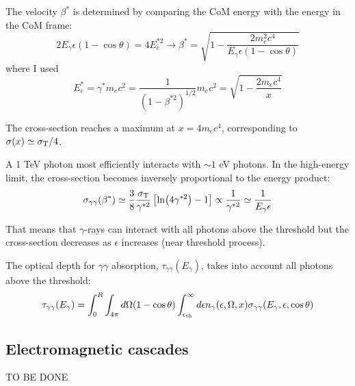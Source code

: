 The velocity \(\beta^*\) is determined by comparing the CoM energy with the energy in the CoM frame:
%
\[
2E_\gamma \epsilon(1- \cos\theta) = 4 E_e^{*2} \rightarrow \beta^* = \sqrt{1 - \frac{2 m_e^2 c^4}{E_\gamma \epsilon (1-\cos\theta)}}
\]
%
where I used
%
\[
E_e^* = \gamma^* m_e c^2 = \frac{1}{(1-\beta^{*2})^{1/2}} m_e c^2 = \sqrt{1 - \frac{2 m_e c^4}{x}}
\]

The cross-section reaches a maximum at \(x = 4 m_e c^4\), corresponding to \(\sigma(x) \simeq \sigma_{\rm T}/4\).

A 1 TeV photon most efficiently interacts with \(\sim 1\) eV photons. In the high-energy limit, the cross-section becomes inversely proportional to the energy product:
%
\[
\sigma_{\gamma\gamma}(\beta^*) \simeq \frac{3}{8} \frac{\sigma_{\rm T}}{\gamma^{*2}} \left[ \ln(4\gamma^{*2}) - 1\right] \propto \frac{1}{\gamma^{*2}} \simeq \frac{1}{E_\gamma \epsilon}
\]

That means that $\gamma$-rays can interact with all photons above the threshold but the cross-section decreases as $\epsilon$ increases (near threshold process).

The optical depth for \(\gamma\gamma\) absorption, \(\tau_{\gamma\gamma}(E_\gamma)\), takes into account all photons above the threshold:
%
\[
\tau_{\gamma\gamma}(E_\gamma) = \int_0^R \int_{4\pi} d\Omega (1-\cos\theta) \int_{\epsilon_{\rm th}}^\infty d\epsilon n_\gamma(\epsilon, \Omega, x) \sigma_{\gamma\gamma}(E_\gamma, \epsilon, \cos\theta)
\]




\subsection{Electromagnetic cascades}

TO BE DONE
